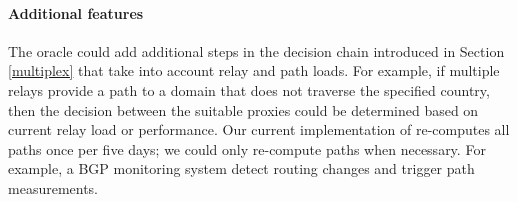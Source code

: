 \paragraph{Additional \system{} features}  
The oracle could add additional steps in the decision
chain introduced in Section \ref{multiplex} that take into account
relay and path loads.  For example, if multiple relays provide a path
to a domain that does not traverse the specified country, then the
decision between the suitable proxies could be determined based on
current relay load or performance.  Our current implementation of
\system{} re-computes all paths once per five days; we could only
re-compute paths when necessary.  For example, a BGP monitoring system
detect routing changes and trigger path measurements.

